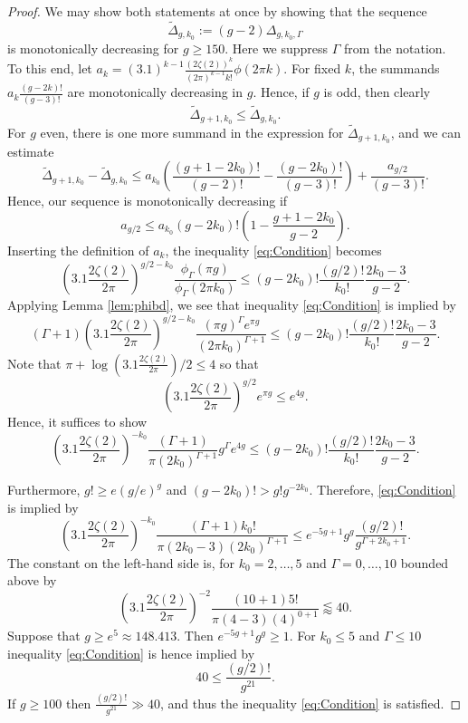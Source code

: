 \documentclass[12pt]{amsart}
\theoremstyle{definition}
\numberwithin{equation}{section}
\renewcommand{\tilde}{\widetilde}
\theoremstyle{definition} %
\theoremstyle{remark}
\begin{document}
\begin{proof}
We may show both statements at once by showing that the sequence
\[
    \tilde\Delta_{g,k_0}:=(g-2)\Delta_{g,k_0,\Gamma}
\]
is monotonically decreasing for $g\geq 150$. Here we suppress $\Gamma$ from the notation.
To this end, let $a_k=(3.1)^{k-1}\frac{(2\zeta(2))^k }{(2\pi)^{k-1}k!}\phi(2\pi k)$. For fixed $k$, the summands $a_k \frac{(g-2k)!}{(g-3)!}$ are monotonically decreasing in $g$.
Hence, if $g$ is odd, then clearly 
\[
    \tilde\Delta_{g+1,k_0}\leq \tilde\Delta_{g,k_0}.
\]
For $g$ even, there is one more summand in the expression for $\tilde\Delta_{g+1,k_0}$, and we can estimate 
\[
    \tilde\Delta_{g+1,k_0}-\tilde\Delta_{g,k_0}
    \leq  a_{k_0}\left(\frac{(g+1-2k_0)!}{(g-2)!} -\frac{(g-2k_0)!}{(g-3)!}\right) + \frac{a_{g/2}}{(g-3)!}.
\]
Hence, our sequence is monotonically decreasing if 
\begin{equation}\label{eq:Condition}
    a_{g/2}
    \leq 
    a_{k_0}
    (g-2k_0)!\left(1-\frac{g+1-2k_0}{g-2}\right).
\end{equation}
Inserting the definition of $a_k$, the inequality \eqref{eq:Condition} becomes
\[
 \left(3.1\frac{2\zeta(2)}{2\pi}\right)^{g/2-k_0}
\frac{\phi_\Gamma(\pi g)}{\phi_\Gamma(2\pi k_0)}
\leq (g-2k_0)! \frac{(g/2)!}{k_0!}\frac{2k_0-3}{g-2}.
\]
Applying Lemma \ref{lem:phibd}, we see that
inequality \eqref{eq:Condition} is implied by 
\[
    (\Gamma+1) \left(3.1\frac{2\zeta(2)}{2\pi}\right)^{g/2-k_0}
    \frac{(\pi g)^\Gamma e^{\pi g}}{(2\pi k_0)^{\Gamma+1}}
    \leq (g-2k_0)! \frac{(g/2)!}{k_0!}\frac{2k_0-3}{g-2}.
\]
Note that $\pi+\log(3.1\frac{2\zeta(2)}{2\pi})/2\leq 4$ so that
\[
    \left(3.1\frac{2\zeta(2)}{2\pi}\right)^{g/2}e^{\pi g} \leq e^{4g}.
\]
Hence, it suffices to show
\[
    \left(3.1\frac{2\zeta(2)}{2\pi}\right)^{-k_0} \frac{(\Gamma+1)}{\pi(2 k_0)^{\Gamma+1}}
    g^\Gamma e^{4 g}
    \leq (g-2k_0)! \frac{(g/2)!}{k_0!}\frac{2k_0-3}{g-2}.
\]

Furthermore, $g! \geq e(g/e)^g$ and $(g-2k_0)!>g! g^{-2k_0}$.
Therefore, \eqref{eq:Condition} is implied by 
\[
    \left(3.1\frac{2\zeta(2)}{2\pi}\right)^{-k_0}    
    \frac{(\Gamma+1)k_0!}{\pi(2k_0-3)(2k_0)^{\Gamma+1}}
    \leq e^{-5g+1} g^g
    \frac{(g/2)!}{g^{\Gamma+2k_0+1}}.
\]
The constant on the left-hand side is, for $k_0=2,\dots, 5$ and $\Gamma=0,\dots, 10$ bounded above by
\[
    \left(3.1\frac{2\zeta(2)}{2\pi}\right)^{-2}    
    \frac{(10+1)5!}{\pi(4-3)(4)^{0+1}}\lessapprox 40.
\]
Suppose that $g\geq e^5\approx 148.413$. Then $e^{-5g+1} g^g\geq 1$. For $k_0\leq 5$ and $\Gamma\leq 10$ 
inequality \eqref{eq:Condition} is hence implied by
\[
    40 
    \leq 
    \frac{(g/2)!}{g^{21}}.
\]
If $g\geq 100$ then $\frac{(g/2)!}{g^{21}}\gg 40$, and thus the inequality \eqref{eq:Condition} is satisfied. 
\end{proof}
    
\end{document}
